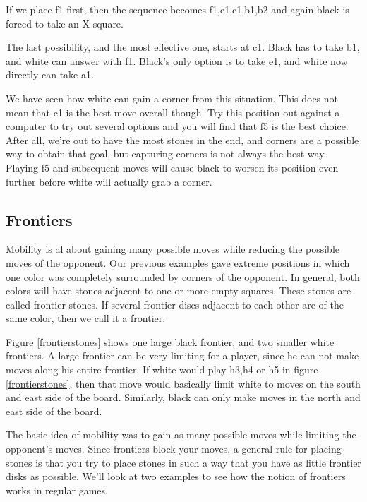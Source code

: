 \documentclass[12pt,twoside]{report}
\begin{document}
If we place f1 first, then the sequence becomes f1,e1,c1,b1,b2 and
again black is forced to take an X square.

The last possibility, and the most effective one, starts at c1.
Black has to take b1, and white can answer with f1. Black's only
option is to take e1, and white now directly can take a1.

We have seen how white can gain a corner from this situation. This
does not mean that c1 is the best move overall though. Try this
position out against a computer to try out several options and you
will find that f5 is the best choice. After all, we're out to have
the most stones in the end, and corners are a possible way to
obtain that goal, but capturing corners is not always the best
way. Playing f5 and subsequent moves will cause black to worsen
its position even further before white will actually grab a
corner.

\subsection{Frontiers}
Mobility is al about gaining many possible moves while reducing
the possible moves of the opponent. Our previous examples gave
extreme positions in which one color was completely surrounded by
corners of the opponent. In general, both colors will have stones
adjacent to one or more empty squares. These stones are called
frontier stones. If several frontier discs adjacent to each other
are of the same color, then we call it a frontier.
\begin{figure}
\frontierstones
\end{figure}
Figure \ref{frontierstones}
shows one large black frontier, and two smaller white frontiers.
A large frontier can be very limiting for a player, since he can
not make moves along his entire frontier. If white would play
h3,h4 or h5 in figure \ref{frontierstones}, then that move would
basically limit white to moves on the south and east side of the
board. Similarly, black can only make moves in the north and east
side of the board.

The basic idea of mobility was to gain as
many possible moves while limiting the opponent's moves. Since
frontiers block your moves, a general rule for placing stones is
that you try to place stones in such a way that you have as little
frontier disks as possible. We'll look at two examples to see how
the notion of frontiers works in regular games.
\end{document}
